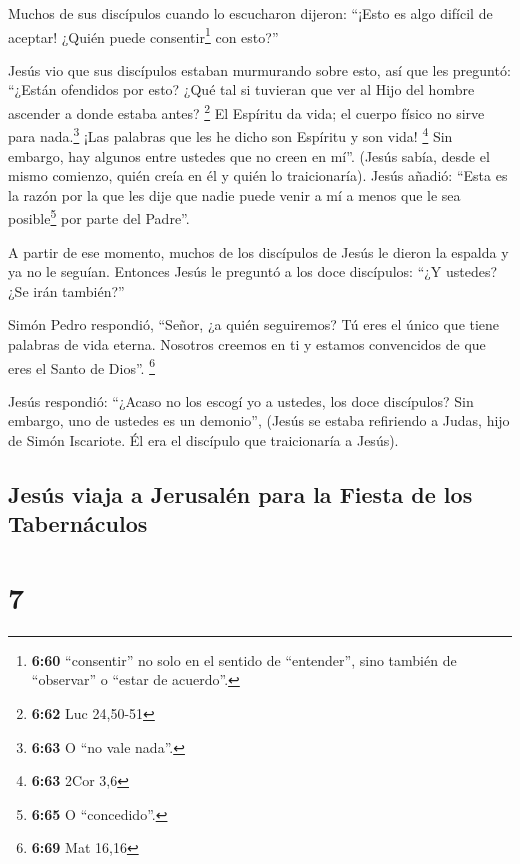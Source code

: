  Muchos de sus discípulos cuando lo escucharon dijeron:
``¡Esto es algo difícil de aceptar! ¿Quién puede consentir\footnote{\textbf{6:60}
  ``consentir'' no solo en el sentido de ``entender'', sino también de
  ``observar'' o ``estar de acuerdo''.} con esto?''

 Jesús vio que sus discípulos estaban murmurando sobre
esto, así que les preguntó: ``¿Están ofendidos por esto? 
¿Qué tal si tuvieran que ver al Hijo del hombre ascender a donde estaba
antes? \footnote{\textbf{6:62} Luc 24,50-51}  El Espíritu
da vida; el cuerpo físico no sirve para nada.\footnote{\textbf{6:63} O
  ``no vale nada''.} ¡Las palabras que les he dicho son Espíritu y son
vida! \footnote{\textbf{6:63} 2Cor 3,6}  Sin embargo, hay
algunos entre ustedes que no creen en mí''. (Jesús sabía, desde el mismo
comienzo, quién creía en él y quién lo traicionaría). 
Jesús añadió: ``Esta es la razón por la que les dije que nadie puede
venir a mí a menos que le sea posible\footnote{\textbf{6:65} O
  ``concedido''.} por parte del Padre''.

 A partir de ese momento, muchos de los discípulos de
Jesús le dieron la espalda y ya no le seguían.  Entonces
Jesús le preguntó a los doce discípulos: ``¿Y ustedes? ¿Se irán
también?''

 Simón Pedro respondió, ``Señor, ¿a quién seguiremos? Tú
eres el único que tiene palabras de vida eterna. 
Nosotros creemos en ti y estamos convencidos de que eres el Santo de
Dios''. \footnote{\textbf{6:69} Mat 16,16}

 Jesús respondió: ``¿Acaso no los escogí yo a ustedes,
los doce discípulos? Sin embargo, uno de ustedes es un demonio'',
 (Jesús se estaba refiriendo a Judas, hijo de Simón
Iscariote. Él era el discípulo que traicionaría a Jesús).

\hypertarget{jesuxfas-viaja-a-jerusaluxe9n-para-la-fiesta-de-los-tabernuxe1culos}{%
\subsection{Jesús viaja a Jerusalén para la Fiesta de los
Tabernáculos}\label{jesuxfas-viaja-a-jerusaluxe9n-para-la-fiesta-de-los-tabernuxe1culos}}

\hypertarget{section-6}{%
\section{7}\label{section-6}}

